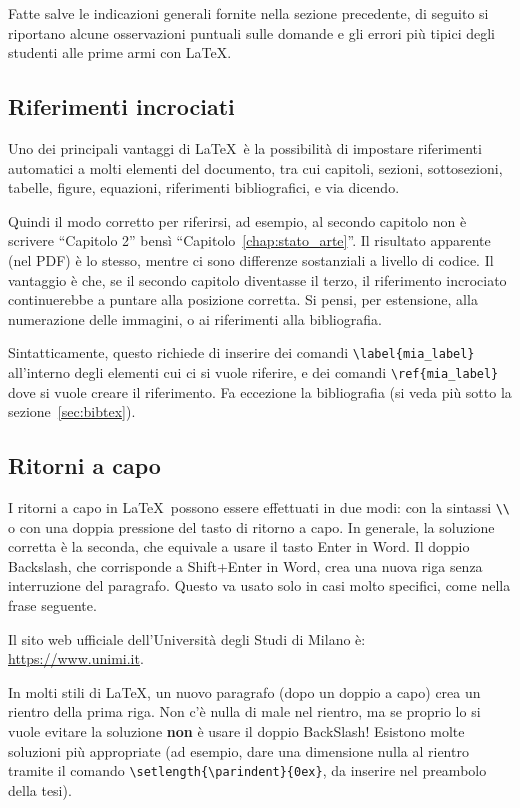 \documentclass[12pt]{report}
\begin{document}
    Fatte salve le indicazioni generali fornite nella sezione precedente, di seguito si riportano alcune osservazioni puntuali sulle domande e gli errori pi\`u tipici degli studenti alle prime armi con \LaTeX.

    \subsection{Riferimenti incrociati}

    Uno dei principali vantaggi di \LaTeX\ è la possibilità di impostare riferimenti automatici a molti elementi del documento, tra cui capitoli, sezioni, sottosezioni, tabelle, figure, equazioni, riferimenti bibliografici, e via dicendo.

    Quindi il modo corretto per riferirsi, ad esempio, al secondo capitolo non è scrivere ``Capitolo 2'' bensì ``Capitolo~\ref{chap:stato_arte}''. Il risultato apparente (nel PDF) è lo stesso, mentre ci sono differenze sostanziali a livello di codice. Il vantaggio è che, se il secondo capitolo diventasse il terzo, il riferimento incrociato continuerebbe a puntare alla posizione corretta. Si pensi, per estensione, alla numerazione delle immagini, o ai riferimenti alla bibliografia.

    Sintatticamente, questo richiede di inserire dei comandi \verb|\label{mia_label}| all'interno degli elementi cui ci si vuole riferire, e dei comandi \verb|\ref{mia_label}| dove si vuole creare il riferimento. Fa eccezione la bibliografia (si veda pi\`u sotto la sezione~\ref{sec:bibtex}).

    \subsection{Ritorni a capo}

    I ritorni a capo in \LaTeX\ possono essere effettuati in due modi: con la sintassi \verb|\\| o con una doppia pressione del tasto di ritorno a capo. In generale, la soluzione corretta è la seconda, che equivale a usare il tasto Enter in Word. Il doppio Backslash, che corrisponde a Shift+Enter in Word, crea una nuova riga senza interruzione del paragrafo. Questo va usato solo in casi molto specifici, come nella frase seguente.

    Il sito web ufficiale dell'Università degli Studi di Milano è:\\
    \url{https://www.unimi.it}.

    In molti stili di \LaTeX, un nuovo paragrafo (dopo un doppio a capo) crea un rientro della prima riga. Non c'\`e nulla di male nel rientro, ma se proprio lo si vuole evitare la soluzione \textbf{non} \`e usare il doppio BackSlash! Esistono molte soluzioni pi\`u appropriate (ad esempio, dare una dimensione nulla al rientro tramite il comando \verb|\setlength{\parindent}{0ex}|, da inserire nel preambolo della tesi).
\end{document}
